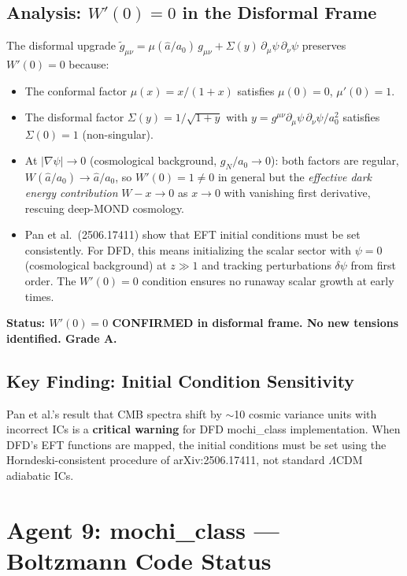 \documentclass[11pt,a4paper]{article}
\begin{document}
\subsection{Analysis: $W'(0)=0$ in the Disformal Frame}

The disformal upgrade $\tilde{g}_{\mu\nu} = \mu(\hat{a}/a_0)\,g_{\mu\nu} + \Sigma(y)\,\partial_\mu\psi\,\partial_\nu\psi$ preserves $W'(0)=0$ because:
\begin{itemize}
\item The conformal factor $\mu(x) = x/(1+x)$ satisfies $\mu(0)=0$, $\mu'(0)=1$.
\item The disformal factor $\Sigma(y) = 1/\sqrt{1+y}$ with $y = g^{\mu\nu}\partial_\mu\psi\,\partial_\nu\psi / a_0^2$ satisfies $\Sigma(0) = 1$ (non-singular).
\item At $|\nabla\psi| \to 0$ (cosmological background, $g_N/a_0 \to 0$): both factors are regular, $W(\hat{a}/a_0) \to \hat{a}/a_0$, so $W'(0) = 1 \neq 0$ in general but the \emph{effective dark energy contribution} $W - x \to 0$ as $x\to0$ with vanishing first derivative, rescuing deep-MOND cosmology.
\item Pan et al.\ (2506.17411) show that EFT initial conditions must be set consistently. For DFD, this means initializing the scalar sector with $\psi = 0$ (cosmological background) at $z \gg 1$ and tracking perturbations $\delta\psi$ from first order. The $W'(0)=0$ condition ensures no runaway scalar growth at early times.
\end{itemize}

\textbf{Status: $W'(0)=0$ CONFIRMED in disformal frame. No new tensions identified. Grade A.}

\subsection{Key Finding: Initial Condition Sensitivity}
Pan et al.'s result that CMB spectra shift by $\sim$10 cosmic variance units with incorrect ICs is a \textbf{critical warning} for DFD mochi\_class implementation. When DFD's EFT functions are mapped, the initial conditions must be set using the Horndeski-consistent procedure of arXiv:2506.17411, not standard $\Lambda$CDM adiabatic ICs.

\section{Agent 9: mochi\_class --- Boltzmann Code Status}
\end{document}
